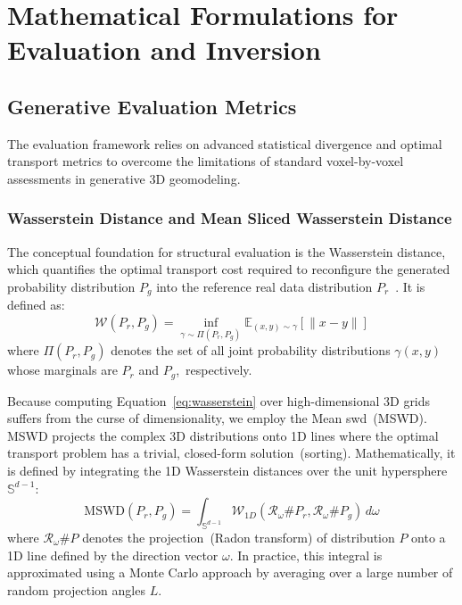\chapter{Mathematical Formulations for Evaluation and Inversion}

\section{Generative Evaluation Metrics}\label{app:evaluation_math}
The evaluation framework relies on advanced statistical divergence and optimal transport metrics to overcome the limitations of standard voxel-by-voxel assessments in generative 3D geomodeling.

\subsection{Wasserstein Distance and Mean Sliced Wasserstein Distance}
The conceptual foundation for structural evaluation is the Wasserstein distance, which quantifies the optimal transport cost required to reconfigure the generated probability distribution $P_g$ into the reference real data distribution $P_r$~\parencite{panaretos2019statistical, rongier2025atowards}. It is defined as:
\begin{equation}\label{eq:wasserstein}
    \mathcal{W}(P_r, P_g) = \inf_{\gamma \sim \Pi(P_r, P_g)} \mathbb{E}_{(x,y) \sim \gamma} [\|x - y\|]
\end{equation}
where $\Pi(P_r, P_g)$ denotes the set of all joint probability distributions $\gamma(x,y)$ whose marginals are $P_r$ and $P_g$,~respectively. 

Because computing Equation~\ref{eq:wasserstein} over high-dimensional 3D grids suffers from the curse of dimensionality, we employ the Mean \gls{swd}~(MSWD). MSWD projects the complex 3D distributions onto 1D lines where the optimal transport problem has a trivial, closed-form solution~(sorting). Mathematically, it is defined by integrating the 1D Wasserstein distances over the unit hypersphere $\mathbb{S}^{d-1}$:
\begin{equation}\label{eq:mswd}
    \text{MSWD}(P_r, P_g) = \int_{\mathbb{S}^{d-1}} \mathcal{W}_{1D}(\mathcal{R}_{\omega} \# P_r, \mathcal{R}_{\omega} \# P_g) \, d\omega
\end{equation}
where $\mathcal{R}_{\omega} \# P$ denotes the projection~(Radon transform) of distribution $P$ onto a 1D line defined by the direction vector $\omega$. In practice, this integral is approximated using a Monte Carlo approach by averaging over a large number of random projection angles $L$.

